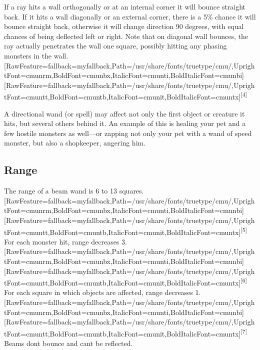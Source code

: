 If a ray hits a wall orthogonally or at an internal corner it will bounce straight back. If it hits a wall diagonally or an external corner, there is a 5\% chance it will bounce straight back, otherwise it will change direction 90 degrees, with equal chances of being deflected left or right. Note that on diagonal wall bounces, the ray actually penetrates the wall one square, possibly hitting any phasing monsters in the wall.\allowbreak{}\setmainfont{cmunrm.ttf}[RawFeature={fallback=myfallback},Path=/usr/share/fonts/truetype/cmu/,UprightFont=cmunrm,BoldFont=cmunbx,ItalicFont=cmunti,BoldItalicFont=cmunbi]\setmonofont{cmunrm.ttf}[RawFeature={fallback=myfallback},Path=/usr/share/fonts/truetype/cmu/,UprightFont=cmuntt,BoldFont=cmuntb,ItalicFont=cmunit,BoldItalicFont=cmuntx]\textsuperscript{{$\text{[}$}4{$\text{]}$}}


A directional wand (or spell) may affect not only the first object or creature it hits, but several others behind it. An example of this is healing your pet and a few hostile monsters as well{\mbox{$\text{---}$}}or zapping not only your pet with a wand of speed monster\footnotemark[85], but also a shopkeeper\footnotemark[86], angering him.



\subsection{Range}
\label{5}
The range of a beam wand is 6 to 13 squares.\allowbreak{}\setmainfont{cmunrm.ttf}[RawFeature={fallback=myfallback},Path=/usr/share/fonts/truetype/cmu/,UprightFont=cmunrm,BoldFont=cmunbx,ItalicFont=cmunti,BoldItalicFont=cmunbi]\setmonofont{cmunrm.ttf}[RawFeature={fallback=myfallback},Path=/usr/share/fonts/truetype/cmu/,UprightFont=cmuntt,BoldFont=cmuntb,ItalicFont=cmunit,BoldItalicFont=cmuntx]\textsuperscript{{$\text{[}$}5{$\text{]}$}} For each monster hit, range decreases 3.\allowbreak{}\setmainfont{cmunrm.ttf}[RawFeature={fallback=myfallback},Path=/usr/share/fonts/truetype/cmu/,UprightFont=cmunrm,BoldFont=cmunbx,ItalicFont=cmunti,BoldItalicFont=cmunbi]\setmonofont{cmunrm.ttf}[RawFeature={fallback=myfallback},Path=/usr/share/fonts/truetype/cmu/,UprightFont=cmuntt,BoldFont=cmuntb,ItalicFont=cmunit,BoldItalicFont=cmuntx]\textsuperscript{{$\text{[}$}6{$\text{]}$}} For each square in which objects are affected, range decreases 1.\allowbreak{}\setmainfont{cmunrm.ttf}[RawFeature={fallback=myfallback},Path=/usr/share/fonts/truetype/cmu/,UprightFont=cmunrm,BoldFont=cmunbx,ItalicFont=cmunti,BoldItalicFont=cmunbi]\setmonofont{cmunrm.ttf}[RawFeature={fallback=myfallback},Path=/usr/share/fonts/truetype/cmu/,UprightFont=cmuntt,BoldFont=cmuntb,ItalicFont=cmunit,BoldItalicFont=cmuntx]\textsuperscript{{$\text{[}$}7{$\text{]}$}} Beams don\textquotesingle{}t bounce and can\textquotesingle{}t be reflected.



